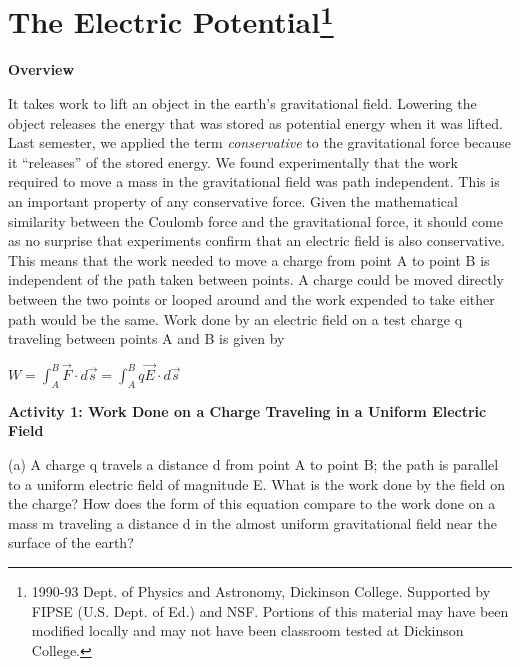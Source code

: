 
\section{The Electric Potential\footnote{%
1990-93 Dept. of Physics and Astronomy, Dickinson College. Supported
by FIPSE (U.S. Dept. of Ed.) and NSF. Portions of this material may
have been modified locally and may not have been classroom tested
at Dickinson College.
}}

\makelabheader %

\bigskip
\textbf{Overview}

It takes work to lift an object in the earth's gravitational field.
Lowering the object releases the energy that was stored as potential
energy when it was lifted. Last semester, we applied the term \emph{conservative}
to the gravitational force because it {}``releases'' 
of the stored energy. We found experimentally that the work required
to move a mass in the gravitational field was path independent. This
is an important property of any conservative force. Given the mathematical
similarity between the Coulomb force and the gravitational force,
it should come as no surprise that experiments confirm that an electric
field is also conservative. This means that the work needed to move
a charge from point A to point B is independent of the path taken
between points. A charge could be moved directly between the two points
or looped around and the work expended to take either path would be
the same. Work done by an electric field on a test charge q traveling
between points A and B is given by

{\centering \( W=\int ^{B}_{A} \)\( \overrightarrow{F}\cdot d\overrightarrow{s}=\int ^{B}_{A}q\overrightarrow{E}\cdot d\overrightarrow{s} \)\par}

\bigskip
\textbf{Activity 1: Work Done on a Charge Traveling in a Uniform Electric
Field}

(a) A charge q travels a distance d from point A to point B; the path
is parallel to a uniform electric field of magnitude E. What is the
work done by the field on the charge? How does the form of this equation
compare to the work done on a mass m traveling a distance d in the
almost uniform gravitational field near the surface of the earth?


